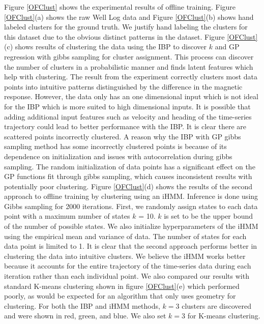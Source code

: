 \documentclass{article}
\begin{document}
Figure \ref{OFClust} shows the experimental results of offline training. Figure \ref{OFClust}(a) shows the raw Well Log data and Figure \ref{OFClust}(b) shows hand labeled clusters for the ground truth. We justify hand labeling the clusters for this dataset due to the obvious distinct patterns in the dataset. Figure \ref{OFClust}(c) shows results of clustering the data using the IBP to discover $k$ and GP regression with gibbs sampling for cluster assignment. This process can discover the number of clusters in a probabilistic manner and finds latent features which help with clustering. The result from the experiment correctly clusters most data points into intuitive patterns distinguished by the difference in the magnetic response. However, the data only has an one dimensional input which is not ideal for the IBP which is more suited to high dimensional inputs. It is possible that adding additional input features such as velocity and heading of the time-series trajectory could lead to better performance with the IBP. It is clear there are scattered points incorrectly clustered. A reason why the IBP with GP gibbs sampling method has some incorrectly clustered points is because of its dependence on initialization and issues with autocorrelation during gibbs sampling. The random initialization of data points has a significant effect on the GP functions fit through gibbs sampling, which causes inconsistent results with potentially poor clustering. Figure \ref{OFClust}(d) shows the results of the second approach to offline training by clustering using an iHMM. Inference is done using Gibbs sampling for 2000 iterations. First, we randomly assign states to each data point with a maximum number of states $k$ = 10. $k$ is set to be the upper bound of the number of possible states. We also initialize hyperparameters of the iHMM using the empirical mean and variance of data. The number of states for each data point is limited to 1. It is clear that the second approach performs better in clustering the data into intuitive clusters. We believe the iHMM works better because it accounts for the entire trajectory of the time-series data during each iteration rather than each individual point. We also compared our results with standard K-means clustering shown in figure \ref{OFClust}(e) which performed poorly, as would be expected for an algorithm that only uses geometry for clustering. For both the IBP and iHMM methods, $k=3$ clusters are discovered and were shown in red, green, and blue. We also set $k=3$ for K-means clustering.
\end{document}
